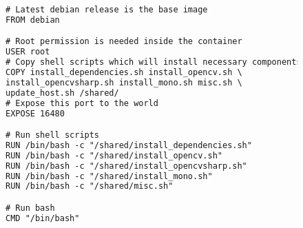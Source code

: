 \begin{figure}[h]
\centering
\begin{minipage}{1\textwidth}
\begin{mdframed}[backgroundcolor=gray!20]
\begin{small}
\begin{lstlisting}[language=XML]
# Latest debian release is the base image
FROM debian

# Root permission is needed inside the container
USER root
# Copy shell scripts which will install necessary components
COPY install_dependencies.sh install_opencv.sh \
install_opencvsharp.sh install_mono.sh misc.sh \
update_host.sh /shared/
# Expose this port to the world
EXPOSE 16480

# Run shell scripts
RUN /bin/bash -c "/shared/install_dependencies.sh"
RUN /bin/bash -c "/shared/install_opencv.sh"
RUN /bin/bash -c "/shared/install_opencvsharp.sh"
RUN /bin/bash -c "/shared/install_mono.sh"
RUN /bin/bash -c "/shared/misc.sh"

# Run bash
CMD "/bin/bash"
\end{lstlisting}
\end{small}
\end{mdframed}
\end{minipage}
\caption{} \label{fig:docker_commands}
\end{figure}